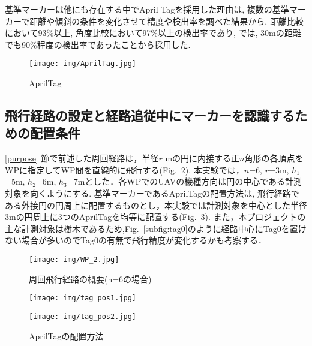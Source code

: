 \documentclass[a4j,fleqn,dvipdfmx,uplatex]{jsarticle}
\newcommand{\figref}[1]{Fig.\ \ref{#1}}
\newcommand{\subsecref}[1]{\ref{#1}\hspace{0.2zw} 節}
\begin{document}
基準マーカーは他にも存在する中でApril Tagを採用した理由は, 複数の基準マーカーで距離や傾斜の条件を変化させて精度や検出率を調べた結果から\cite{compare_tags}, 
距離比較において93\%以上, 角度比較において97\%以上の検出率であり, \cite{AprilTag2}では, 30mの距離でも90\%程度の検出率であったことから採用した.  

\begin{figure}[tb]
    \centering
    \texttt{[image: img/AprilTag.jpg]}
    \caption{AprilTag}
    \label{fig:apriltags}
\end{figure}

\subsection{飛行経路の設定と経路追従中にマーカーを認識するための配置条件}\label{subsec:tag_pos}
\subsecref{purpose}で前述した周回経路は，半径$r$ mの円に内接する正$n$角形の各頂点をWPに指定してWP間を直線的に飛行する(\figref{fig:spiral_path}). 
本実験では，$n$=6, $r$=3m, $h_1$=5m, $h_2$=6m, $h_3$=7mとした．各WPでのUAVの機種方向は円の中心である計測対象を向くようにする. 
基準マーカーであるAprilTagの配置方法は, 飛行経路である外接円の円周上に配置するものとし，本実験では計測対象を中心とした半径3mの円周上に3つのAprilTagを均等に配置する(\figref{fig:tag_pos}). 
また，本プロジェクトの主な計測対象は樹木であるため,\figref{subfig:tag0}のように経路中心にTag0を置けない場合が多いのでTag0の有無で飛行精度が変化するかも考察する．

\begin{figure}[tb]
    \centering
        \texttt{[image: img/WP\_2.jpg]}
        \caption{周回飛行経路の概要(n=6の場合)}
        \label{fig:spiral_path}
\end{figure}

\begin{figure}[tb]
    \centering
    \begin{minipage}[b]{0.45\linewidth}
      \centering
      \texttt{[image: img/tag\_pos1.jpg]}
      \label{subfig:tag0}
    \end{minipage}
    \begin{minipage}[b]{0.45\linewidth}
      \centering
      \texttt{[image: img/tag\_pos2.jpg]}
      \label{subfig:notag0}
    \end{minipage}
    \caption{AprilTagの配置方法}
    \label{fig:tag_pos}
\end{figure}
\end{document}

